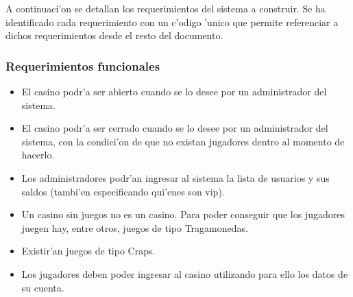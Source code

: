 A continuaci'on se detallan los requerimientos del sistema a construir. Se ha identificado cada requerimiento con un c'odigo 'unico que permite referenciar a dichos requerimientos desde el resto del documento.

\subsubsection{Requerimientos funcionales}



\begin{itemize}

\item {} 

 El casino podr'a ser abierto cuando se lo desee por un administrador del sistema. 

\item {} 

 El casino podr'a ser cerrado cuando se lo desee por un administrador del sistema, con la condici'on de que no existan jugadores dentro al momento de hacerlo.

\item {} 

 Los administradores podr'an ingresar al sistema la lista de usuarios y sus saldos (tambi'en especificando qui'enes son vip).

\item {} 

 Un casino sin juegos no es un casino. Para poder conseguir que los jugadores juegen hay, entre otros, juegos de tipo Tragamonedas.

\item {} 

 Existir'an juegos de tipo Craps.

\item {} 

 Los jugadores deben poder ingresar al casino utilizando para ello los datos de su cuenta.


\end{itemize}
